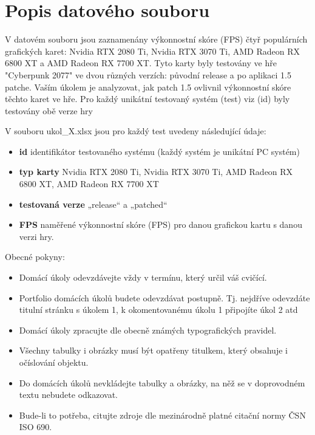 \section*{Popis datového souboru}
\label{sec:data-source-description}

V datovém souboru jsou zaznamenány výkonnostní skóre (FPS) čtyř populárních grafických karet:
Nvidia RTX 2080 Ti, Nvidia RTX 3070 Ti, AMD Radeon RX 6800 XT a AMD Radeon RX 7700 XT. Tyto karty
byly testovány ve hře "Cyberpunk 2077" ve dvou různých verzích: původní release a po aplikaci 1.5
patche. Vaším úkolem je analyzovat, jak patch 1.5 ovlivnil výkonnostní skóre těchto karet ve hře. Pro
každý unikátní testovaný systém (test) viz (id) byly testovány obě verze hry

\vspace{1em}
\noindent
V souboru ukol\_X.xlsx jsou pro každý test uvedeny následující údaje:

\begin{itemize}
  \item \textbf{id} \TODO identifikátor testovaného systému (každý systém je unikátní PC systém)
  \item \textbf{typ karty} \TODO Nvidia RTX 2080 Ti, Nvidia RTX 3070 Ti, AMD Radeon RX 6800 XT, AMD Radeon RX 7700 XT
  \item \textbf{testovaná verze} \TODO „release“ a „patched“
  \item \textbf{FPS} \TODO naměřené výkonnostní skóre (FPS) pro danou grafickou kartu s danou verzi hry.
\end{itemize}

\noindent
Obecné pokyny:

\begin{itemize}
    \item Domácí úkoly odevzdávejte vždy v termínu, který určil váš cvičící.
    \item Portfolio domácích úkolů budete odevzdávat postupně. Tj. nejdříve odevzdáte titulní stránku s úkolem 1, k okomentovanému úkolu 1 připojíte úkol 2 atd
    \item Domácí úkoly zpracujte dle obecně známých typografických pravidel. 
    \item Všechny tabulky i obrázky musí být opatřeny titulkem, který obsahuje i očíslování objektu.  
    \item Do domácích úkolů nevkládejte tabulky a obrázky, na něž se v doprovodném textu nebudete odkazovat.
    \item Bude-li to potřeba, citujte zdroje dle mezinárodně platné citační normy ČSN ISO 690.
\end{itemize}

\endinput